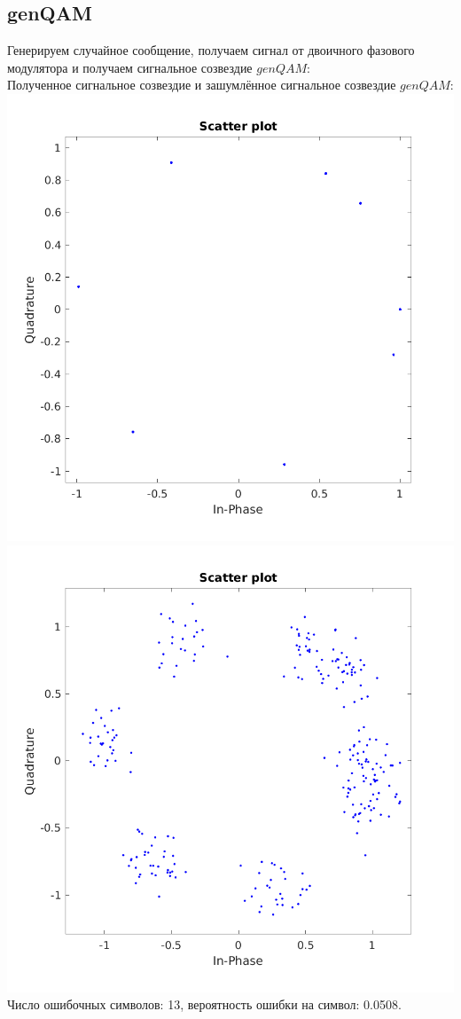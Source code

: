 \documentclass[a4paper]{article}
\begin{document}
\subsection{genQAM}
Генерируем случайное сообщение, получаем сигнал от двоичного фазового модулятора и получаем сигнальное созвездие $genQAM$:
\\
Полученное сигнальное созвездие и зашумлённое сигнальное созвездие $genQAM$:\\
\includegraphics[scale=0.4]{lab6/figures/figure_6.png}
\includegraphics[scale=0.4]{lab6/figures/figure_7.png}\\
Число ошибочных символов: 13, вероятность ошибки на символ: 0.0508.
\end{document}
